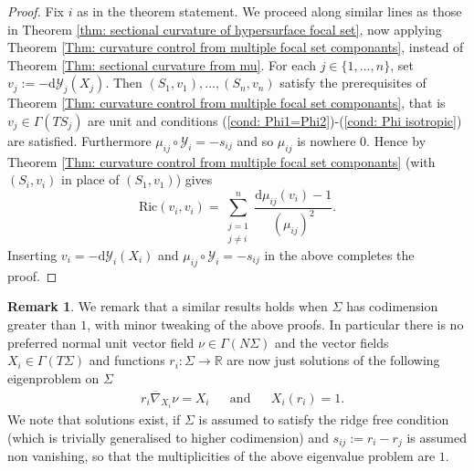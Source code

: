 \documentclass[12pt]{amsart}
\theoremstyle{plain}
\theoremstyle{definition}
\newtheorem{Rem}{Remark}
\def\R{\mathbb{R}}
\newcommand{\td}{\mathrm{d}}
\numberwithin{equation}{section}
\begin{document}
\begin{proof}
    Fix $i$ as in the theorem statement. We proceed along similar lines as those in Theorem \ref{thm: sectional curvature of hypersurface focal set}, now applying Theorem \ref{Thm: curvature control from multiple focal set componants}, instead of Theorem \ref{Thm: sectional curvature from mu}. For each $j\in \{1,\ldots,n\}$, set $v_j:=-\td\mathcal{Y}_j(X_j)$. Then $(S_1,v_1),\ldots,(S_n,v_n)$ satisfy the prerequisites of Theorem \ref{Thm: curvature control from multiple focal set componants}, that is $v_j\in\Gamma(TS_j)$ are unit and conditions (\ref{cond: Phi1=Phi2})-(\ref{cond: Phi isotropic}) are satisfied. Furthermore $\mu_{ij}\circ\mathcal{Y}_i=-s_{ij}$ and so $\mu_{ij}$ is nowhere $0$. Hence by Theorem \ref{Thm: curvature control from multiple focal set componants} (with $(S_i,v_i)$ in place of $(S_1,v_1)$) gives
    \[
    \mbox{Ric}(v_i,v_i)=\sum_{\substack{j=1\\j\neq i}}^{n}\frac{\td \mu_{ij}(v_i)-1}{(\mu_{ij})^2}.
    \]
    Inserting $v_i=-\td \mathcal{Y}_i(X_i)$ and $\mu_{ij}\circ\mathcal{Y}_i=-s_{ij}$ in the above completes the proof.
\end{proof}
\begin{Rem}\label{rem: Thm 2 with arb codim}
    We remark that a similar results holds when $\Sigma$ has codimension greater than $1$, with minor tweaking of the above proofs. In particular there is no preferred normal unit vector field $\nu\in\Gamma(N\Sigma)$ and the vector fields $X_i\in\Gamma(T\Sigma)$ and functions $r_i:\Sigma\to \R$ are now just solutions of the following eigenproblem on $\Sigma$
    \begin{align*}
        &r_i\overline{\nabla}_{X_i} \nu=X_i &&\text{and} &&X_i(r_i)=1.
    \end{align*}
    We note that solutions exist, if $\Sigma$ is assumed to satisfy the ridge free condition (which is trivially generalised to higher codimension) and $s_{ij}:=r_i-r_j$ is assumed non vanishing, so that the multiplicities of the above eigenvalue problem are $1$.
\end{Rem}
\end{document}
